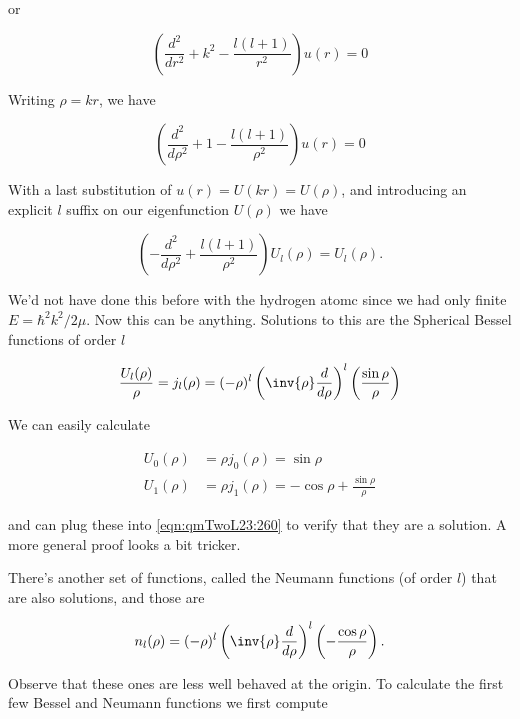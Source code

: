 or

\begin{equation}\label{eqn:qmTwoL23:220}
\left( \frac{d^2}{dr^2} + k^2 -\frac{l (l+1) }{r^2} \right) u(r) = 0
\end{equation}

Writing $\rho = k r$, we have

\begin{equation}\label{eqn:qmTwoL23:240}
\left( \frac{d^2}{d\rho^2} + 1 -\frac{l (l+1) }{\rho^2} \right) u(r) = 0
\end{equation}

With a last substitution of $u(r) = U( k r ) = U(\rho)$, and introducing an explicit $l$ suffix on our eigenfunction $U(\rho)$ we have

\begin{equation}\label{eqn:qmTwoL23:260}
\left( -\frac{d^2}{d\rho^2} +\frac{l (l+1) }{\rho^2} \right) U_l(\rho) = U_l(\rho).
\end{equation}

We'd not have done this before with the hydrogen atomc since we had only finite $E = \hbar^2 k^2/2 \mu$.  Now this can be anything.  Solutions to this are the Spherical Bessel functions of order $l$

\begin{equation}\label{eqn:qmTwoL23:280}
\frac{U_l(\rho)}{\rho} = j_l(\rho) = (-\rho)^l \left( \inv{\rho} \frac{d}{d\rho} \right)^l \left( \frac{\sin\rho}{\rho} \right)
\end{equation}

We can easily calculate 

\begin{align}\label{eqn:qmTwoL23:300}
U_0(\rho) &= \rho j_0(\rho) = \sin\rho \\
U_1(\rho) &= \rho j_1(\rho) = -\cos\rho + \frac{\sin\rho}{\rho}
\end{align}

and can plug these into \ref{eqn:qmTwoL23:260} to verify that they are a solution.  A more general proof looks a bit tricker.

There's another set of functions, called the Neumann functions (of order $l$) that are also solutions, and those are

\begin{equation}\label{eqn:qmTwoL23:320}
n_l(\rho) = (-\rho)^l \left( \inv{\rho} \frac{d}{d\rho} \right)^l \left( -\frac{\cos\rho}{\rho} \right).
\end{equation}

Observe that these ones are less well behaved at the origin.  To calculate the first few Bessel and Neumann functions we first compute

